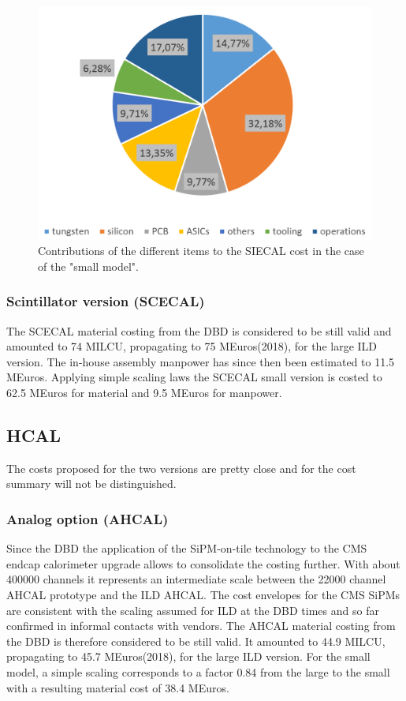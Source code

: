 \begin{figure}[h!]
\centering
\includegraphics[width=0.8\hsize]{Costing/ECalsm_Si_cost_sharing.PNG}
\caption{Contributions of the different items to the SIECAL cost in the case of the "small model".} %
\label{fig:det:ECalsm_Si_cost_sharing}
\end{figure}

\subsubsection{Scintillator version (SCECAL)}
The SCECAL material costing from the DBD is considered to be still valid and amounted to 74 MILCU, propagating to 75 MEuros(2018), for the large ILD version. The in-house assembly manpower has since then been estimated to 11.5 MEuros. Applying simple scaling laws the SCECAL small version is costed to 62.5 MEuros for material and 9.5 MEuros for manpower.

\subsection{HCAL}
The costs proposed for the two versions are pretty close and for the cost summary will not be distinguished.
\subsubsection{Analog option (AHCAL)}
Since the DBD the application of the SiPM-on-tile technology to the CMS endcap calorimeter upgrade allows to consolidate the costing further. With about 400000 channels it represents an intermediate scale between the 22000 channel AHCAL prototype and the ILD AHCAL. 
The cost envelopes for the CMS SiPMs are consistent with the scaling assumed for ILD at the DBD times and so far confirmed in informal contacts with vendors. The AHCAL material costing from the DBD is therefore considered to be still valid. It amounted to 44.9 MILCU, propagating to 45.7 MEuros(2018), for the large ILD version. 
For the small model, a simple scaling corresponds to a factor 0.84 from the large to the small with a resulting material cost of 38.4 MEuros.


